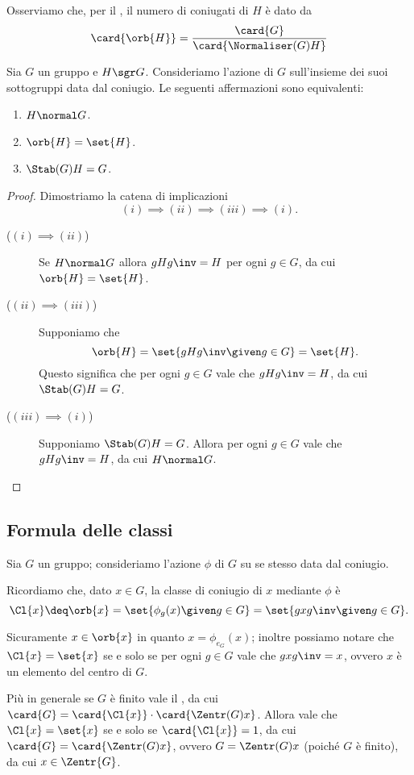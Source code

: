 Osserviamo che, per il , il numero di coniugati di $H$ è dato da \[
    \card{\orb{H}} = \frac{\card{G}}{\card{\Normaliser(G){H}}}    
\]
\begin{proposition}
    Sia $G$ un gruppo e $H \sgr G$. 
    Consideriamo l'azione di $G$ sull'insieme dei suoi sottogruppi data dal coniugio.
    Le seguenti affermazioni sono equivalenti:
    \begin{enumerate}[label={(\roman*)}]
        \item $H \normal G$.
        \item $\orb{H} = \set{H}$.
        \item $\Stab(G){H} = G$.
    \end{enumerate}
\end{proposition}
\begin{proof}
    Dimostriamo la catena di implicazioni \[
        (i) \implies (ii) \implies (iii) \implies (i).    
    \]
    \begin{description}
        \item[($(i) \implies (ii)$)] Se $H \normal G$ allora $gHg\inv = H$ per ogni $g \in G$, da cui $\orb{H} = \set{H}$.
        \item[($(ii) \implies (iii)$)] Supponiamo che \[
            \orb{H} = \set{gHg\inv \given g \in G} = \set{H}.    
        \] Questo significa che per ogni $g \in G$ vale che $gHg\inv = H$, da cui $\Stab(G){H} = G$.
        \item[($(iii) \implies (i)$)] Supponiamo $\Stab(G){H} = G$. Allora per ogni $g \in G$ vale che $gHg\inv = H$, da cui $H \normal G$.
    \end{description}
\end{proof}

\subsection{Formula delle classi}
Sia $G$ un gruppo; consideriamo l'azione $\phi$ di $G$ su se stesso data dal coniugio.

Ricordiamo che, dato $x \in G$, la classe di coniugio di $x$ mediante $\phi$ è \[
    \Cl{x} \deq \orb{x} = \set{\phi_g(x) \given g \in G} = \set{gxg\inv \given g \in G}.    
\]

Sicuramente $x \in \orb{x}$ in quanto $x = \phi_{e_G}(x)$; inoltre possiamo notare che $\Cl{x} = \set{x}$ se e solo se per ogni $g \in G$ vale che $gxg\inv = x$, ovvero $x$ è un elemento del centro di $G$.

Più in generale se $G$ è finito vale il , da cui $\card{G} = \card{\Cl{x}}\cdot \card{\Zentr(G){x}}$. Allora vale che $\Cl{x} = \set{x}$ se e solo se $\card{\Cl{x}} = 1$, da cui $\card{G} = \card{\Zentr(G){x}}$, ovvero $G = \Zentr(G){x}$ (poiché $G$ è finito), da cui $x \in \Zentr{G}$.

